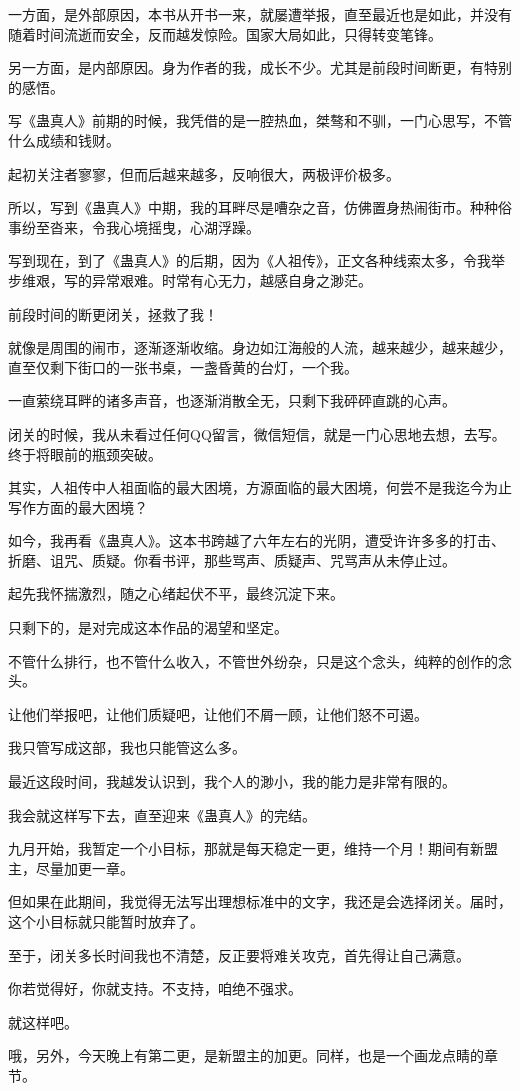 \begin{this_body}
一方面，是外部原因，本书从开书一来，就屡遭举报，直至最近也是如此，并没有随着时间流逝而安全，反而越发惊险。国家大局如此，只得转变笔锋。

另一方面，是内部原因。身为作者的我，成长不少。尤其是前段时间断更，有特别的感悟。

写《蛊真人》前期的时候，我凭借的是一腔热血，桀骜和不驯，一门心思写，不管什么成绩和钱财。

起初关注者寥寥，但而后越来越多，反响很大，两极评价极多。

所以，写到《蛊真人》中期，我的耳畔尽是嘈杂之音，仿佛置身热闹街市。种种俗事纷至沓来，令我心境摇曳，心湖浮躁。

写到现在，到了《蛊真人》的后期，因为《人祖传》，正文各种线索太多，令我举步维艰，写的异常艰难。时常有心无力，越感自身之渺茫。

前段时间的断更闭关，拯救了我！

就像是周围的闹市，逐渐逐渐收缩。身边如江海般的人流，越来越少，越来越少，直至仅剩下街口的一张书桌，一盏昏黄的台灯，一个我。

一直萦绕耳畔的诸多声音，也逐渐消散全无，只剩下我砰砰直跳的心声。

闭关的时候，我从未看过任何QQ留言，微信短信，就是一门心思地去想，去写。终于将眼前的瓶颈突破。

其实，人祖传中人祖面临的最大困境，方源面临的最大困境，何尝不是我迄今为止写作方面的最大困境？

如今，我再看《蛊真人》。这本书跨越了六年左右的光阴，遭受许许多多的打击、折磨、诅咒、质疑。你看书评，那些骂声、质疑声、咒骂声从未停止过。

起先我怀揣激烈，随之心绪起伏不平，最终沉淀下来。

只剩下的，是对完成这本作品的渴望和坚定。

不管什么排行，也不管什么收入，不管世外纷杂，只是这个念头，纯粹的创作的念头。

让他们举报吧，让他们质疑吧，让他们不屑一顾，让他们怒不可遏。

我只管写成这部，我也只能管这么多。

最近这段时间，我越发认识到，我个人的渺小，我的能力是非常有限的。

我会就这样写下去，直至迎来《蛊真人》的完结。

九月开始，我暂定一个小目标，那就是每天稳定一更，维持一个月！期间有新盟主，尽量加更一章。

但如果在此期间，我觉得无法写出理想标准中的文字，我还是会选择闭关。届时，这个小目标就只能暂时放弃了。

至于，闭关多长时间我也不清楚，反正要将难关攻克，首先得让自己满意。

你若觉得好，你就支持。不支持，咱绝不强求。

就这样吧。

哦，另外，今天晚上有第二更，是新盟主的加更。同样，也是一个画龙点睛的章节。

\end{this_body}

